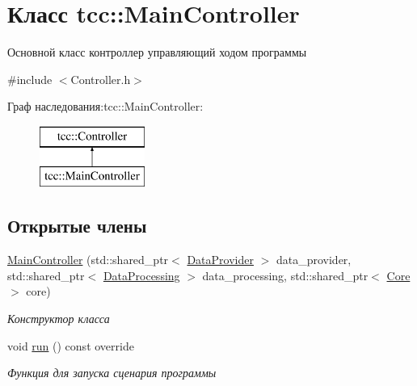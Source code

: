 \hypertarget{classtcc_1_1_main_controller}{}\section{Класс tcc\+:\+:Main\+Controller}
\label{classtcc_1_1_main_controller}


Основной класс контроллер управляющий ходом программы  




{\ttfamily \#include $<$Controller.\+h$>$}

Граф наследования\+:tcc\+:\+:Main\+Controller\+:\begin{figure}[H]
\begin{center}
\leavevmode
\includegraphics[height=2.000000cm]{classtcc_1_1_main_controller}
\end{center}
\end{figure}
\subsection*{Открытые члены}
\begin{DoxyCompactItemize}
\item 
\mbox{\hyperlink{classtcc_1_1_main_controller_ae32551aebc2b9449e62f88be63d5e317}{Main\+Controller}} (std\+::shared\+\_\+ptr$<$ \mbox{\hyperlink{classtcc_1_1_data_provider}{Data\+Provider}} $>$ data\+\_\+provider, std\+::shared\+\_\+ptr$<$ \mbox{\hyperlink{classtcc_1_1_data_processing}{Data\+Processing}} $>$ data\+\_\+processing, std\+::shared\+\_\+ptr$<$ \mbox{\hyperlink{classtcc_1_1_core}{Core}} $>$ core)
\begin{DoxyCompactList}\small\item\em Конструктор класса \end{DoxyCompactList}\item 
\mbox{\label{classtcc_1_1_main_controller_ae2bba3331119518ee5e9b4b139158dd6}} 
void \mbox{\hyperlink{classtcc_1_1_main_controller_ae2bba3331119518ee5e9b4b139158dd6}{run}} () const override
\begin{DoxyCompactList}\small\item\em Функция для запуска сценария программы \end{DoxyCompactList}\end{DoxyCompactItemize}


